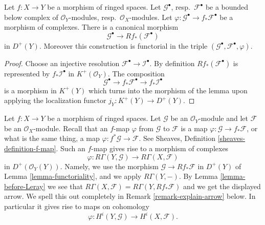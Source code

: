 \begin{lemma}
\label{lemma-functoriality}
Let $f : X \to Y$ be a morphism of ringed spaces.
Let $\mathcal{G}^\bullet$, resp.\ $\mathcal{F}^\bullet$ be
a bounded below complex of $\mathcal{O}_Y$-modules,
resp.\ $\mathcal{O}_X$-modules. Let
$\varphi : \mathcal{G}^\bullet \to f_*\mathcal{F}^\bullet$
be a morphism of complexes. There is a canonical morphism
$$
\mathcal{G}^\bullet
\longrightarrow
Rf_*(\mathcal{F}^\bullet)
$$
in $D^{+}(Y)$. Moreover this construction is functorial in the triple
$(\mathcal{G}^\bullet, \mathcal{F}^\bullet, \varphi)$.
\end{lemma}

\begin{proof}
Choose an injective resolution $\mathcal{F}^\bullet \to \mathcal{I}^\bullet$.
By definition $Rf_*(\mathcal{F}^\bullet)$ is represented by
$f_*\mathcal{I}^\bullet$ in $K^{+}(\mathcal{O}_Y)$.
The composition
$$
\mathcal{G}^\bullet \to f_*\mathcal{F}^\bullet \to f_*\mathcal{I}^\bullet
$$
is a morphism in $K^{+}(Y)$ which turns
into the morphism of the lemma upon applying the
localization functor $j_Y : K^{+}(Y) \to D^{+}(Y)$.
\end{proof}

\noindent
Let $f : X \to Y$ be a morphism of ringed spaces.
Let $\mathcal{G}$ be an $\mathcal{O}_Y$-module and let
$\mathcal{F}$ be an $\mathcal{O}_X$-module. Recall that an
$f$-map $\varphi$ from $\mathcal{G}$ to $\mathcal{F}$ is a map
$\varphi : \mathcal{G} \to f_*\mathcal{F}$, or what is the same
thing, a map $\varphi : f^*\mathcal{G} \to \mathcal{F}$.
See Sheaves, Definition \ref{sheaves-definition-f-map}.
Such an $f$-map gives rise to a morphism of complexes
\begin{equation}
\label{equation-functorial-derived}
\varphi :
R\Gamma(Y, \mathcal{G})
\longrightarrow
R\Gamma(X, \mathcal{F})
\end{equation}
in $D^{+}(\mathcal{O}_Y(Y))$. Namely, we use the morphism
$\mathcal{G} \to Rf_*\mathcal{F}$ in $D^{+}(Y)$ of
Lemma \ref{lemma-functoriality}, and we apply $R\Gamma(Y, -)$.
By Lemma \ref{lemma-before-Leray} we see that
$R\Gamma(X, \mathcal{F}) = R\Gamma(Y, Rf_*\mathcal{F})$
and we get the displayed arrow. We spell this out completely in
Remark \ref{remark-explain-arrow} below.
In particular it gives
rise to maps on cohomology
\begin{equation}
\label{equation-functorial}
\varphi : H^i(Y, \mathcal{G}) \longrightarrow H^i(X, \mathcal{F}).
\end{equation}

